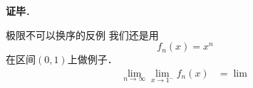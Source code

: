 \textbf{证毕}．



\begin{example}{极限不可以换序的反例}
我们还是用
\begin{equation}
f_n(x)=x^n
\end{equation}
在区间$(0, 1)$上做例子．
\begin{equation}
\begin{aligned}
\lim\limits_{n\to\infty}\lim\limits_{x\to 1^-}f_n(x)&=\lim\limits_{}
\end{aligned}
\end{equation}
\end{example}


















